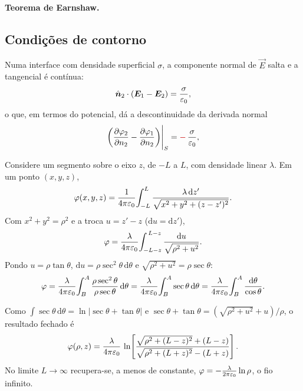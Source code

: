 \paragraph{Teorema de Earnshaw.} 

\subsection{Condições de contorno}

Numa interface com densidade superficial $\sigma$, a componente normal de
$\vec{E}$ salta e a tangencial é contínua:
\begin{equation}
  \hat{\bm{n}}_2\cdot(\bm{E}_1-\bm{E}_2)=\frac{\sigma}{\varepsilon_{0}},
\end{equation}
o que, em termos do potencial, dá a descontinuidade da derivada normal
\begin{equation}
  \left(\dpar{\varphi_2}{n_2}-\dpar{\varphi_1}{n_2}\right)\!\Bigg|_{S}
  =\textcolor{coradd}{-}\,\frac{\sigma}{\eps},
\end{equation}

\begin{exemplo}
Considere um segmento sobre o eixo $z$, de $-L$ a $L$, com densidade linear
$\lambda$. Em um ponto $(x,y,z)$,
\begin{equation}
  \varphi(x,y,z)=\frac{1}{4\pi\varepsilon_{0}}\!\int_{-L}^{L}
     \frac{\lambda\,\mathrm{d}z'}{\sqrt{x^2+y^2+(z-z')^2}}.
\end{equation}
Com $x^2+y^2=\rho^2$ e a troca $u=z'-z$ ($\mathrm{d}u=\mathrm{d}z'$),
\begin{equation}
  \varphi=\frac{\lambda}{4\pi\varepsilon_{0}}\!\int_{-L-z}^{\,L-z}
     \frac{\mathrm{d}u}{\sqrt{\rho^2+u^2}}.
\end{equation}
Pondo $u=\rho\tan\theta$, $\mathrm{d}u=\rho\sec^2\theta\,\mathrm{d}\theta$ e
$\sqrt{\rho^2+u^2}=\rho\sec\theta$:
\begin{equation}
  \varphi=\frac{\lambda}{4\pi\varepsilon_{0}}\!\int_{B}^{A}
     \frac{\rho\sec^2\theta}{\rho\sec\theta}\,\mathrm{d}\theta
  =\frac{\lambda}{4\pi\varepsilon_{0}}\!\int_{B}^{A}\sec\theta\,\mathrm{d}\theta
  =\frac{\lambda}{4\pi\varepsilon_{0}}\!\int_{B}^{A}\frac{\mathrm{d}\theta}{\cos\theta}.
\end{equation}
\begin{nota}
Como $\int\sec\theta\,\mathrm{d}\theta=\ln|\sec\theta+\tan\theta|$ e
$\sec\theta+\tan\theta=(\sqrt{\rho^2+u^2}+u)/\rho$, o resultado fechado é
\begin{equation}
  \varphi(\rho,z)=\frac{\lambda}{4\pi\varepsilon_{0}}\,
    \ln\!\left[\frac{\sqrt{\rho^2+(L-z)^2}+(L-z)}
                    {\sqrt{\rho^2+(L+z)^2}-(L+z)}\right].
\end{equation}
No limite $L\to\infty$ recupera-se, a menos de constante,
$\varphi=-\tfrac{\lambda}{2\pi\varepsilon_{0}}\ln\rho$, o fio infinito.
\end{nota}
\end{exemplo}

